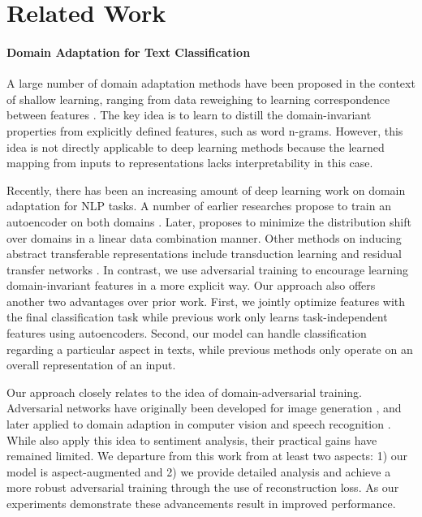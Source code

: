 
\section{Related Work}

\paragraph{Domain Adaptation for Text Classification}
A large number of domain adaptation methods have been proposed in the context of shallow learning, ranging from data reweighing \cite{huang2006correcting,gong2013connecting} to learning correspondence between features \cite{blitzer2006domain,daume2009frustratingly,yang2015unsupervised}. The key idea is to learn to distill the domain-invariant properties from explicitly defined features, such as word n-grams. However, this idea is not directly applicable to deep learning methods because the learned mapping from inputs to representations lacks interpretability in this case.

Recently, there has been an increasing amount of deep learning work on domain adaptation for NLP tasks. A number of earlier researches propose to train an autoencoder on both domains \cite{glorot2011domain,chen2012marginalized,chopra2013dlid}. Later,  proposes to minimize the distribution shift over domains in a linear data combination manner. Other methods on inducing abstract transferable representations include transduction learning \cite{sener2016learning} and residual transfer networks \cite{long2016unsupervised}. In contrast, we use adversarial training to encourage learning domain-invariant features in a more explicit way. Our approach also offers another two advantages over prior work. First, we jointly optimize features with the final classification task while previous work only learns task-independent features using autoencoders. Second, our model can handle classification regarding a particular aspect in texts, while previous methods only operate on an overall representation of an input.

Our approach closely relates to the idea of domain-adversarial training. Adversarial networks have originally been developed for image generation \cite{goodfellow2014generative,makhzani2015adversarial}, and later applied to domain adaption in computer vision \cite{ganin2014unsupervised,ganin2015domain,domain_separation_nets16} and speech recognition \cite{shinohara2016adversarial}. While  also apply this idea to sentiment analysis, their practical gains have remained limited. We departure from this work from at least two aspects: 1) our model is aspect-augmented and 2) we provide detailed analysis and achieve a more robust adversarial training through the use of reconstruction loss. As our experiments demonstrate these advancements result in improved performance.


